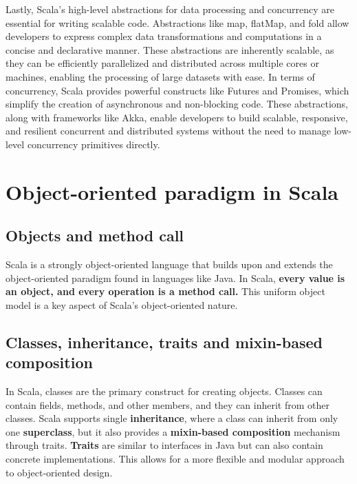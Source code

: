 Lastly, Scala's high-level abstractions for data processing and concurrency are essential for writing scalable code. Abstractions like map, flatMap, and fold allow developers to express complex data transformations and computations in a concise and declarative manner.\footnotemark {} These abstractions are inherently scalable, as they can be efficiently parallelized and distributed across multiple cores or machines, enabling the processing of large datasets with ease. In terms of concurrency, Scala provides powerful constructs like Futures and Promises, which simplify the creation of asynchronous and non-blocking code. These abstractions, along with frameworks like Akka, enable developers to build scalable, responsive, and resilient concurrent and distributed systems without the need to manage low-level concurrency primitives directly.\footnotemark {}

\section{Object-oriented paradigm in Scala}

\subsection{Objects and method call}
Scala is a strongly object-oriented language that builds upon and extends the object-oriented paradigm found in languages like Java. In Scala, \textbf{every value is an object, and every operation is a method call.} This uniform object model is a key aspect of Scala's object-oriented nature.


\subsection{Classes, inheritance, traits and mixin-based composition}
In Scala, classes are the primary construct for creating objects. Classes can contain fields, methods, and other members, and they can inherit from other classes. Scala supports single \textbf{inheritance}, where a class can inherit from only one \textbf{superclass}, but it also provides a \textbf{mixin-based composition} mechanism through traits. \textbf{Traits} are similar to interfaces in Java but can also contain concrete implementations. This allows for a more flexible and modular approach to object-oriented design.\footnotemark {}



